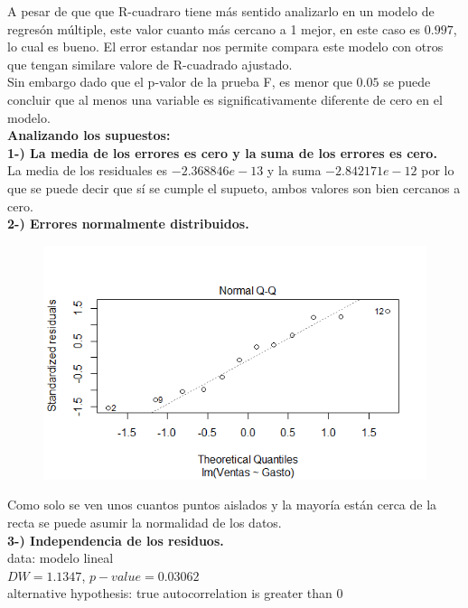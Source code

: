 \documentclass[12pt,a4paper]{article}
\begin{document}
	A pesar de que que R-cuadraro tiene más sentido analizarlo en un modelo de regresón múltiple, este valor cuanto más cercano a 1 mejor, en este caso es $0.997$, lo cual es bueno. El error estandar nos permite compara este modelo con otros que tengan similare valore de R-cuadrado ajustado.\\ 
	
	Sin embargo dado que el p-valor de la prueba F, es menor que $0.05$ se puede concluir que al menos una variable es significativamente diferente de cero en el modelo.\\
	
	\textbf{Analizando los supuestos:}\\
	
	\textbf{1-) La media de los errores es cero y la suma de los errores es cero.}\\
	 
	La media de los residuales es $-2.368846e-13$ y la suma $-2.842171e-12$ por lo que se puede decir que sí se cumple el supueto, ambos valores son bien cercanos a cero.\\
	
	\textbf{2-) Errores normalmente distribuidos.} \\
	
	\begin{figure}[h!]
		\centering
		\includegraphics[scale=0.8]{simplemodel_qqplot.png}
	\end{figure}
	
	Como solo se ven unos cuantos puntos aislados y la mayoría están cerca de la recta se puede asumir la normalidad de los datos.\\ 
	
	\textbf{3-) Independencia de los residuos.}\\
	data:  modelo lineal\\
	$DW = 1.1347$, $p-value = 0.03062$\\
	alternative hypothesis: true autocorrelation is greater than 0\\
	
\end{document}
